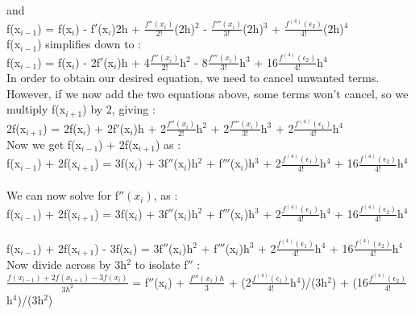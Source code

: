 \documentclass{article}
\begin{document}
	and \\
	
	f(x$_{i-1}$) = f(x$_i$) - f$'$(x$_i$)2h + $\frac{f''(x_i)}{2!}$(2h)$^2$ - $\frac{f'''(x_i)}{3!}$(2h)$^3$ + $\frac{f^{(4)}(\epsilon_2)}{4!}$(2h)$^4$ \\
	
	f(x$_{i-1}$) simplifies down to : \\
	
	f(x$_{i-1}$) = f(x$_i$) - 2f$'$(x$_i$)h + 4$\frac{f''(x_i)}{2!}$h$^2$ - 8$\frac{f'''(x_i)}{3!}$h$^3$ + 16$\frac{f^{(4)}(\epsilon_2)}{4!}$h$^4$ \\
	
	In order to obtain our desired equation, we need to cancel unwanted terms. However, if we now add the two equations above, some terms won't cancel, so we multiply f(x$_{i+1}$) by 2, giving :\\
	
	2f(x$_{i+1}$) = 2f(x$_i$) + 2f$'$(x$_i$)h + 2$\frac{f''(x_i)}{2!}$h$^2$ + 2$\frac{f'''(x_i)}{3!}$h$^3$ + 2$\frac{f^{(4)}(\epsilon_1)}{4!}$h$^4$ \\
	
	Now we get f(x$_{i-1}$) + 2f(x$_{i+1}$) as :\\
	f(x$_{i-1}$) + 2f(x$_{i+1}$) = 3f(x$_i$) + 3f$''$(x$_i$)h$^2$ + f$'''$(x$_i$)h$^3$ + 2$\frac{f^{(4)}(\epsilon_1)}{4!}$h$^4$ + 16$\frac{f^{(4)}(\epsilon_2)}{4!}$h$^4$\\\\
	
	We can now solve for f$''(x_i)$, as : \\
	
	f(x$_{i-1}$) + 2f(x$_{i+1}$) = 3f(x$_i$) + 3f$''$(x$_i$)h$^2$ + f$'''$(x$_i$)h$^3$ + 2$\frac{f^{(4)}(\epsilon_1)}{4!}$h$^4$ + 16$\frac{f^{(4)}(\epsilon_2)}{4!}$h$^4$ \\\\
	
	f(x$_{i-1}$) + 2f(x$_{i+1}$) - 3f(x$_i$) = 3f$''$(x$_i$)h$^2$ + f$'''$(x$_i$)h$^3$ + 2$\frac{f^{(4)}(\epsilon_1)}{4!}$h$^4$ + 16$\frac{f^{(4)}(\epsilon_2)}{4!}$h$^4$ \\
	
	Now divide across by 3h$^2$ to isolate f$''$ : \\
	
	$\frac{f(x_{i-1}) + 2f(x_{i+1}) - 3f(x_i)}{3h^2}$ = f$''$(x$_i$) + $\frac{f'''(x_i)h}{3}$ + (2$\frac{f^{(4)}(\epsilon_1)}{4!}$h$^4$)/(3h$^2$) + (16$\frac{f^{(4)}(\epsilon_2)}{4!}$h$^4$)/(3h$^2$) \\
	
\end{document}
